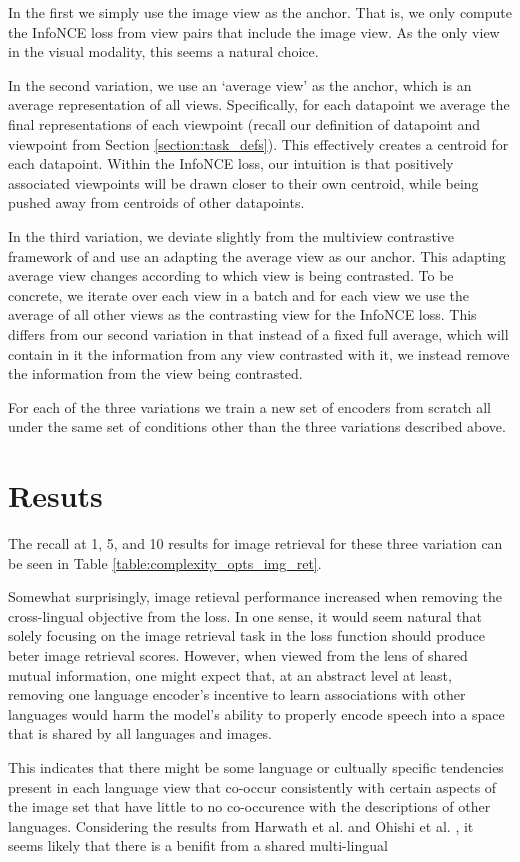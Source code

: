 In the first we simply use the image view as the anchor.
That is, we only compute the InfoNCE loss from view pairs that include the image view.
As the only view in the visual modality, this seems a natural choice.

In the second variation, we use an `average view' as the anchor, which is an average representation of all views.
Specifically, for each datapoint we average the final representations of each viewpoint (recall our definition of datapoint and viewpoint from Section \ref{section:task_defs}).
This effectively creates a centroid for each datapoint. %
Within the InfoNCE loss, our intuition is that positively associated viewpoints will be drawn closer to their own centroid, while being pushed away from centroids of other datapoints.

In the third variation, we deviate slightly from the multiview contrastive framework of \citeme and use an adapting the average view as our anchor.
This adapting average view changes according to which view is being contrasted.
To be concrete, we iterate over each view in a batch and for each view we use the average of all other views as the contrasting view for the InfoNCE loss.
This differs from our second variation in that instead of a fixed full average, which will contain in it the information from any view contrasted with it, we instead remove the information from the view being contrasted.

For each of the three variations we train a new set of encoders from scratch all under the same set of conditions other than the three variations described above.

\section{Resuts}
\label{section:loss_comp_results}
The recall at 1, 5, and 10 results for image retrieval for these three variation can be seen in Table \ref{table:complexity_opts_img_ret}.

Somewhat surprisingly, image retieval performance increased when removing the cross-lingual objective from the loss.
In one sense, it would seem natural that solely focusing on the image retrieval task in the loss function should produce beter image retrieval scores.
However, when viewed from the lens of shared mutual information, one might expect that, at an abstract level at least, removing one language encoder's incentive to learn associations with other languages would harm the model's ability to properly encode speech into a space that is shared by all languages and images.

This indicates that there might be some language or cultually specific tendencies present in each language view that co-occur consistently with certain aspects of the image set that have little to no co-occurence with the descriptions of other languages.
Considering the results from Harwath et al. \cite{} and Ohishi et al. \cite{ohishi2020trilingual}, it seems likely that there is a benifit from a shared multi-lingual




